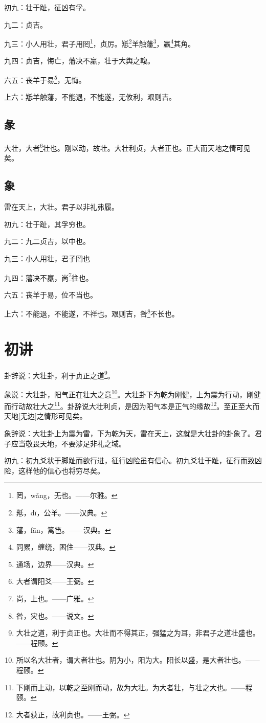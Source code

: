 \documentclass[12pt,oneside]{book}
\begin{document}
初九：壮于趾，征凶有孚。

九二：贞吉。

九三：小人用壮，君子用罔\footnote{罔，wǎng，无也。——尔雅。}，贞厉。羝\footnote{羝，dī，公羊。——汉典。}羊触藩\footnote{藩，fān，篱笆。——汉典。}，羸\footnote{同累，缠绕，困住——汉典。}其角。

九四：贞吉，悔亡，藩决不羸，壮于大舆之輹。

六五：丧羊于易\footnote{通场，边界——汉典。}，无悔。

上六：羝羊触藩，不能退，不能遂，无攸利，艰则吉。

\subsection{彖}
大壮，大者\footnote{大者谓阳爻——王弼。}壮也。刚以动，故壮。大壮利贞，大者正也。正大而天地之情可见矣。

\subsection{象}
雷在天上，大壮。君子以非礼弗履。

初九：壮于趾，其孚穷也。

九二：九二贞吉，以中也。

九三：小人用壮，君子罔也

九四：藩决不羸，尚\footnote{尚，上也。——广雅。}往也。

六五：丧羊于易，位不当也。

上六：不能退，不能遂，不祥也。艰则吉，咎\footnote{咎，灾也。——说文。}不长也。

\section{初讲}
卦辞说：大壮卦，利于贞正之道\footnote{大壮之道，利于贞正也。大壮而不得其正，强猛之为耳，非君子之道壮盛也。——程颐。}。

彖说：大壮卦，阳气正在壮大之意\footnote{所以名大壮者，谓大者壮也。阴为小，阳为大。阳长以盛，是大者壮也。——程颐。}。大壮卦下为乾为刚健，上为震为行动，刚健而行动故壮大之\footnote{下刚而上动，以乾之至刚而动，故为大壮。为大者壮，与壮之大也。——程颐。}。卦辞说大壮利贞，是因为阳气本是正气的缘故\footnote{大者获正，故利贞也。——王弼。}。至正至大而天地[无边]之情形可见矣。

象辞说：大壮卦上为震为雷，下为乾为天，雷在天上，这就是大壮卦的卦象了。君子应当敬畏天地，不要涉足非礼之域。

初九：初九爻状于脚趾而欲行进，征行凶险虽有信心。初九爻壮于趾，征行而致凶险，这样他的信心也将穷尽矣。
\end{document}
